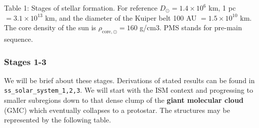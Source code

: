 \documentclass[11pt]{article}
\begin{document}
Table 1: Stages of stellar formation. For reference
\(D_\odot=1.4\times 10^6\) km, 1 pc \(=3.1\times 10^{13}\) km, and the
diameter of the Kuiper belt 100 AU \(=1.5\times 10^{10}\) km. The core
density of the sun is \(\rho_{\textrm{core},\odot} = 160\) g/cm3. PMS
stands for pre-main sequence.

\subsubsection{Stages 1-3}\label{stages-1-3}

We will be brief about these stages. Derivations of stated results can
be found in \texttt{ss\_solar\_system\_1,2,3}. We will start with the
ISM context and progressing to smaller subregions down to that dense
clump of the \textbf{giant molecular cloud} (GMC) which eventually
collapses to a protostar. The structures may be represented by the
following table.
\end{document}
